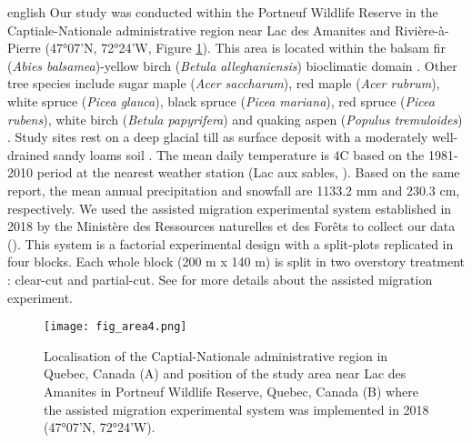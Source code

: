 \begin{otherlanguage*}{english}
  Our study was conducted within the Portneuf Wildlife Reserve in the Captiale-Nationale administrative region near Lac des Amanites and Rivière-à-Pierre (47°07'N, 72°24'W, Figure \ref{fig:area}). 
  This area is located within the balsam fir (\textit{Abies balsamea})-yellow birch (\textit{Betula alleghaniensis}) bioclimatic domain \citep{saucierChapitreEcologieForestiere2009}.
  Other tree species include sugar maple (\textit{Acer saccharum}), red maple (\textit{Acer rubrum}), white spruce (\textit{Picea glauca}), black spruce (\textit{Picea mariana}), red spruce (\textit{Picea rubens}), white birch (\textit{Betula papyrifera}) and quaking aspen (\textit{Populus tremuloides}) \citep{olaBelowgroundCarbonStocks2024}. 
  Study sites rest on a deep glacial till as surface deposit with a moderately well-drained sandy loams soil \citep{CanadianSystemSoil1998}.
  The mean daily temperature is 4C based on the 1981-2010 period at the nearest weather station (Lac aux sables, \citealp{environmentcanadaCanadianClimateNormals2019}). 
  Based on the same report, the mean annual precipitation and snowfall are 1133.2 mm and 230.3 cm, respectively.
  We used the assisted migration experimental system established in 2018 by the Ministère des Ressources naturelles et des Forêts to collect our data (\citealp{royoDesiredREgenerationAssisted2023}).
  This system is a factorial experimental design with a split-plots replicated in four blocks. 
  Each whole block (200 m x 140 m) is split in two overstory treatment : clear-cut and partial-cut. 
  See \cite{royoDesiredREgenerationAssisted2023} for more details about the assisted migration experiment.

\end{otherlanguage*}

\begin{figure}[ht!]
	\centering
	\texttt{[image: fig\_area4.png]}
	\caption[Localisation of the Captiale-Nationale administrative region in Quebec, Canada and position of the study area near Lac des Amanites in Portneuf Wildlife Reserve, Quebec, Canada.]
  {Localisation of the Captial-Nationale administrative region in Quebec, Canada (A) and position of the study area near Lac des Amanites in Portneuf Wildlife Reserve, Quebec, Canada (B) where the assisted migration experimental system was implemented in 2018 (47°07'N, 72°24'W).}
	\label{fig:area}
	\end{figure}  



